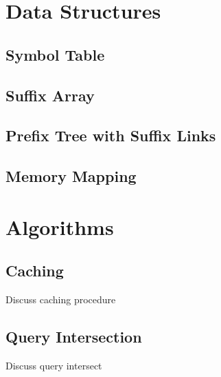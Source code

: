 \documentclass{pbml}
\begin{document}
\section{Data Structures}
\label{data-structures}

\subsection{Symbol Table}

\subsection{Suffix Array}

\subsection{Prefix Tree with Suffix Links}

\subsection{Memory Mapping}


\section{Algorithms}
\label{algorithms}

\subsection{Caching}
Discuss caching procedure

\subsection{Query Intersection}
\label{query-intersection}
Discuss query intersect
\end{document}
